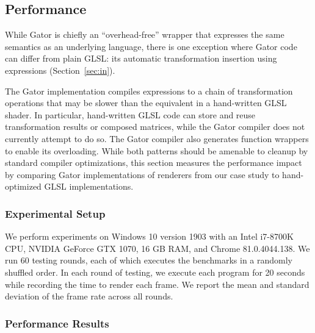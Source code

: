 \documentclass[../main.tex]{subfiles}
\begin{document}
{\subsection{Performance}
\label{sec:performance}

While Gator is chiefly an ``overhead-free'' wrapper that expresses the same semantics as an underlying language,
there is one exception where Gator code can differ from plain GLSL:
its automatic transformation insertion using  expressions (Section~\ref{sec:in}).

The Gator implementation compiles  expressions to a chain of transformation operations that may be slower than the equivalent in a hand-written GLSL shader.
In particular, hand-written GLSL code can store and reuse transformation results or composed matrices, while the Gator compiler does not currently attempt to do so.
The Gator compiler also generates function wrappers to enable its overloading.
While both patterns should be amenable to cleanup by standard compiler optimizations,
this section measures the performance impact by comparing Gator implementations of renderers from our case study to hand-optimized GLSL implementations.

\subsubsection{Experimental Setup}

We perform experiments on Windows 10 version 1903 with an Intel i7-8700K CPU, NVIDIA GeForce GTX 1070, 16 GB RAM, and Chrome 81.0.4044.138.
We run 60 testing rounds, each of which executes the benchmarks in a randomly shuffled order.
In each round of testing, we execute each program for 20 seconds while recording the time to render each frame.
We report the mean and standard deviation of the frame rate across all rounds.

\subsubsection{Performance Results}

}
\end{document}
